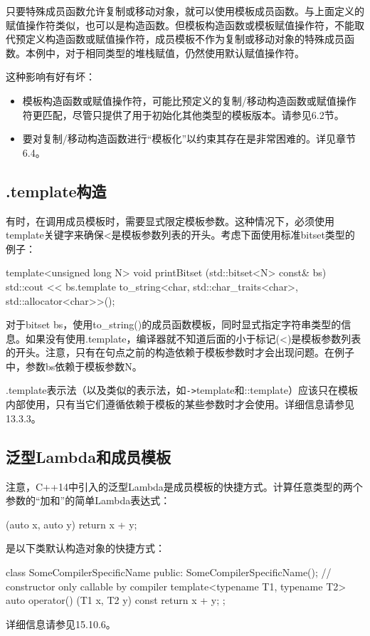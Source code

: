 只要特殊成员函数允许复制或移动对象，就可以使用模板成员函数。与上面定义的赋值操作符类似，也可以是构造函数。但模板构造函数或模板赋值操作符，不能取代预定义构造函数或赋值操作符，成员模板不作为复制或移动对象的特殊成员函数。本例中，对于相同类型的堆栈赋值，仍然使用默认赋值操作符。

这种影响有好有坏：

\begin{itemize}
\item 
模板构造函数或赋值操作符，可能比预定义的复制/移动构造函数或赋值操作符更匹配，尽管只提供了用于初始化其他类型的模板版本。请参见6.2节。

\item 
要对复制/移动构造函数进行“模板化”以约束其存在是非常困难的。详见章节6.4。
\end{itemize}

\subsection{.template构造}

有时，在调用成员模板时，需要显式限定模板参数。这种情况下，必须使用template关键字来确保<是模板参数列表的开头。考虑下面使用标准bitset类型的例子：

\begin{cpp}
template<unsigned long N>
void printBitset (std::bitset<N> const& bs) {
	std::cout << bs.template to_string<char, std::char_traits<char>,
			std::allocator<char>>();
}
\end{cpp}

对于bitset bs，使用to\_string()的成员函数模板，同时显式指定字符串类型的信息。如果没有使用.template，编译器就不知道后面的小于标记(<)是模板参数列表的开头。注意，只有在句点之前的构造依赖于模板参数时才会出现问题。在例子中，参数bs依赖于模板参数N。

.template表示法（以及类似的表示法，如\texttt{->}template和::template）应该只在模板内部使用，只有当它们遵循依赖于模板的某些参数时才会使用。详细信息请参见13.3.3。

\subsection{泛型Lambda和成员模板}

注意，C++14中引入的泛型Lambda是成员模板的快捷方式。计算任意类型的两个参数的“加和”的简单Lambda表达式：

\begin{cpp}
[] (auto x, auto y) {
	return x + y;
}
\end{cpp}

是以下类默认构造对象的快捷方式：

\begin{cpp}
class SomeCompilerSpecificName {
	public:
	SomeCompilerSpecificName(); // constructor only callable by compiler
	template<typename T1, typename T2>
	auto operator() (T1 x, T2 y) const {
		return x + y;
	}
};
\end{cpp}

详细信息请参见15.10.6。








